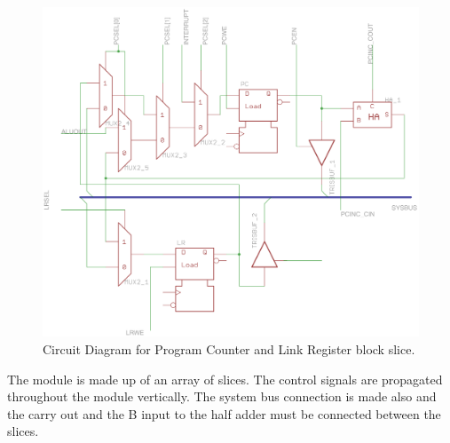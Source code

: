 \begin{figure}
\includegraphics[width=\textwidth]{../../eagle/PcBlock/PcBlock_slice.png}
\caption{Circuit Diagram for Program Counter and Link Register block slice.}
\label{fig:pc:circuit}
\end{figure}

The module is made up of an array of slices. 
The control signals are propagated throughout the module vertically. 
The system bus connection is made also and the carry out and the B input to the half adder must be connected between the slices.

